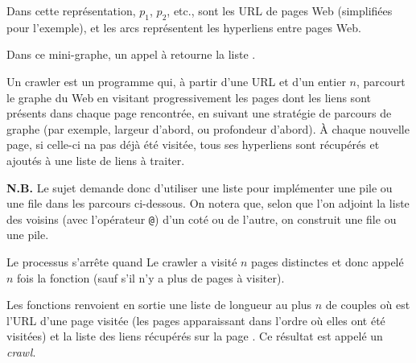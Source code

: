 Dans cette représentation, $p_1$, $p_2$, etc., sont les URL de pages Web (simplifiées pour l'exemple), et les arcs représentent les hyperliens entre pages Web.

Dans ce mini-graphe, un appel à  retourne la liste \type{["p2"; "p5"]}.

Un crawler est un programme qui, à partir d'une URL et d'un entier $n$, parcourt le graphe du Web en visitant progressivement les pages dont les liens sont présents dans chaque page rencontrée, en suivant une stratégie de parcours de graphe (par exemple, largeur d'abord, ou profondeur d'abord). À chaque nouvelle page, si celle-ci na pas déjà été visitée, tous ses hyperliens sont récupérés et ajoutés à une liste de liens à traiter. 

{\bf N.B.} {\sf Le sujet demande donc d'utiliser une liste pour implémenter une pile ou une file dans les parcours ci-dessous. On notera que, selon que l'on adjoint la liste des voisins (avec l'opérateur \lstinline{@}) d'un coté ou de l'autre, on construit une file ou une pile.}

Le processus s'arrête quand Le crawler a visité $n$ pages distinctes et donc appelé $n$ fois la fonction  (sauf s'il n'y a plus de pages à visiter).

Les fonctions  renvoient en sortie une liste de longueur au plus $n$ de couples  où  est l'URL d'une page visitée (les pages apparaissant dans l'ordre où elles ont été visitées) et  la liste des liens récupérés sur la page .
Ce résultat est appelé un {\it crawl}.

